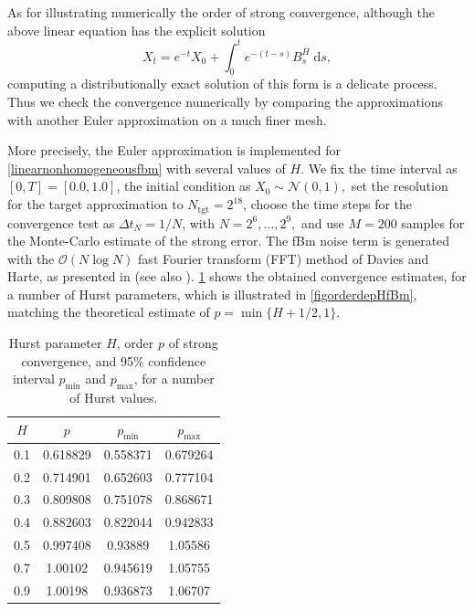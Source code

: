 \documentclass[reqno,12pt]{amsart}
\theoremstyle{plain} %
\theoremstyle{definition} %
\begin{document}
As for illustrating numerically the order of strong convergence, although the above linear equation has the explicit solution
\begin{equation}
    X_t = e^{-t}X_0 + \int_0^t e^{-(t-s)}B^H_s\;\mathrm{d}s,
\end{equation}
computing a distributionally exact solution of this form is a delicate process. Thus we check the convergence numerically by comparing the approximations with another Euler approximation on a much finer mesh.

More precisely, the Euler approximation is implemented for \eqref{linearnonhomogeneousfbm} with several values of $H$. We fix the time interval as $[0, T] = [0.0, 1.0]$, the initial condition as $X_0 \sim \mathcal{N}(0, 1),$ set the resolution for the target approximation to $N_{\textrm{tgt}} = 2^{18}$, choose the time steps for the convergence test as $\Delta t_N = 1/N$, with $N = 2^6, \ldots, 2^9,$ and use $M = 200$ samples for the Monte-Carlo estimate of the strong error. The fBm noise term is generated with the $\mathcal{O}(N\log N)$ fast Fourier transform (FFT) method of Davies and Harte, as presented in \cite{DiekerMandjes2003} (see also \cite[Section 14.4]{HanKloeden2017}). \cref{taborderdepHfBm} shows the obtained convergence estimates, for a number of Hurst parameters, which is illustrated in \cref{figorderdepHfBm}, matching the theoretical estimate of $p = \min\{H+1/2, 1\}.$

\begin{table}
    \begin{tabular}[htb]{|c|c|c|c|}
        \hline $H$ & $p$ & $p_{\textrm{min}}$ & $p_{\textrm{max}}$ \\
        \hline \hline
        0.1 & 0.618829 & 0.558371 & 0.679264 \\
        0.2 & 0.714901 & 0.652603 & 0.777104 \\
        0.3 & 0.809808 & 0.751078 & 0.868671 \\
        0.4 & 0.882603 & 0.822044 & 0.942833 \\
        0.5 & 0.997408 & 0.93889 & 1.05586 \\
        0.7 & 1.00102 & 0.945619 & 1.05755 \\
        0.9 & 1.00198 & 0.936873 & 1.06707 \\
        \hline
    \end{tabular}
    \bigskip

    \caption{Hurst parameter $H$, order $p$ of strong convergence, and 95\% confidence interval $p_{\textrm{min}}$ and $p_{\textrm{max}}$, for a number of Hurst values.}
    \label{taborderdepHfBm}
\end{table}
\end{document}

